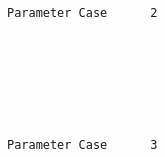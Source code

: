 \documentclass[11pt]{article}
\begin{document}
    \begin{center}
    \end{center}
    { \hspace*{\fill} \\}
    
    \begin{center}
    \end{center}
    { \hspace*{\fill} \\}
    
    \begin{Verbatim}[commandchars=\\\{\}]
	 Parameter Case 	 2

    \end{Verbatim}

    \begin{center}
    \end{center}
    { \hspace*{\fill} \\}
    
    \begin{center}
    \end{center}
    { \hspace*{\fill} \\}
    
    \begin{center}
    \end{center}
    { \hspace*{\fill} \\}
    
    \begin{Verbatim}[commandchars=\\\{\}]
	 Parameter Case 	 3

    \end{Verbatim}

    \begin{center}
    \end{center}
    { \hspace*{\fill} \\}
    
\end{document}
